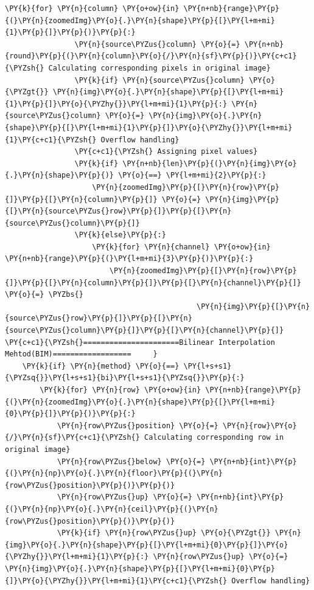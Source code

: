\documentclass[a4paper,10pt]{article}%
\begin{document}
\begin{tcolorbox}[breakable, size=fbox, boxrule=1pt, pad at break*=1mm,colback=cellbackground, colframe=cellborder]
\begin{Verbatim}[commandchars=\\\{\}]
            \PY{k}{for} \PY{n}{column} \PY{o+ow}{in} \PY{n+nb}{range}\PY{p}{(}\PY{n}{zoomedImg}\PY{o}{.}\PY{n}{shape}\PY{p}{[}\PY{l+m+mi}{1}\PY{p}{]}\PY{p}{)}\PY{p}{:}
                \PY{n}{source\PYZus{}column} \PY{o}{=} \PY{n+nb}{round}\PY{p}{(}\PY{n}{column}\PY{o}{/}\PY{n}{sf}\PY{p}{)}\PY{c+c1}{\PYZsh{} Calculating corresponding pixels in original image}
                \PY{k}{if} \PY{n}{source\PYZus{}column} \PY{o}{\PYZgt{}} \PY{n}{img}\PY{o}{.}\PY{n}{shape}\PY{p}{[}\PY{l+m+mi}{1}\PY{p}{]}\PY{o}{\PYZhy{}}\PY{l+m+mi}{1}\PY{p}{:} \PY{n}{source\PYZus{}column} \PY{o}{=} \PY{n}{img}\PY{o}{.}\PY{n}{shape}\PY{p}{[}\PY{l+m+mi}{1}\PY{p}{]}\PY{o}{\PYZhy{}}\PY{l+m+mi}{1}\PY{c+c1}{\PYZsh{} Overflow handling}
                \PY{c+c1}{\PYZsh{} Assigning pixel values}
                \PY{k}{if} \PY{n+nb}{len}\PY{p}{(}\PY{n}{img}\PY{o}{.}\PY{n}{shape}\PY{p}{)} \PY{o}{==} \PY{l+m+mi}{2}\PY{p}{:}
                    \PY{n}{zoomedImg}\PY{p}{[}\PY{n}{row}\PY{p}{]}\PY{p}{[}\PY{n}{column}\PY{p}{]} \PY{o}{=} \PY{n}{img}\PY{p}{[}\PY{n}{source\PYZus{}row}\PY{p}{]}\PY{p}{[}\PY{n}{source\PYZus{}column}\PY{p}{]}
                \PY{k}{else}\PY{p}{:}
                    \PY{k}{for} \PY{n}{channel} \PY{o+ow}{in} \PY{n+nb}{range}\PY{p}{(}\PY{l+m+mi}{3}\PY{p}{)}\PY{p}{:}
                        \PY{n}{zoomedImg}\PY{p}{[}\PY{n}{row}\PY{p}{]}\PY{p}{[}\PY{n}{column}\PY{p}{]}\PY{p}{[}\PY{n}{channel}\PY{p}{]} \PY{o}{=} \PYZbs{}
                                            \PY{n}{img}\PY{p}{[}\PY{n}{source\PYZus{}row}\PY{p}{]}\PY{p}{[}\PY{n}{source\PYZus{}column}\PY{p}{]}\PY{p}{[}\PY{n}{channel}\PY{p}{]}
\PY{c+c1}{\PYZsh{}======================Bilinear Interpolation Mehtod(BIM)==================     }
    \PY{k}{if} \PY{n}{method} \PY{o}{==} \PY{l+s+s1}{\PYZsq{}}\PY{l+s+s1}{bi}\PY{l+s+s1}{\PYZsq{}}\PY{p}{:}
        \PY{k}{for} \PY{n}{row} \PY{o+ow}{in} \PY{n+nb}{range}\PY{p}{(}\PY{n}{zoomedImg}\PY{o}{.}\PY{n}{shape}\PY{p}{[}\PY{l+m+mi}{0}\PY{p}{]}\PY{p}{)}\PY{p}{:}
            \PY{n}{row\PYZus{}position} \PY{o}{=} \PY{n}{row}\PY{o}{/}\PY{n}{sf}\PY{c+c1}{\PYZsh{} Calculating corresponding row in original image}
            \PY{n}{row\PYZus{}below} \PY{o}{=} \PY{n+nb}{int}\PY{p}{(}\PY{n}{np}\PY{o}{.}\PY{n}{floor}\PY{p}{(}\PY{n}{row\PYZus{}position}\PY{p}{)}\PY{p}{)}
            \PY{n}{row\PYZus{}up} \PY{o}{=} \PY{n+nb}{int}\PY{p}{(}\PY{n}{np}\PY{o}{.}\PY{n}{ceil}\PY{p}{(}\PY{n}{row\PYZus{}position}\PY{p}{)}\PY{p}{)}
            \PY{k}{if} \PY{n}{row\PYZus{}up} \PY{o}{\PYZgt{}} \PY{n}{img}\PY{o}{.}\PY{n}{shape}\PY{p}{[}\PY{l+m+mi}{0}\PY{p}{]}\PY{o}{\PYZhy{}}\PY{l+m+mi}{1}\PY{p}{:} \PY{n}{row\PYZus{}up} \PY{o}{=} \PY{n}{img}\PY{o}{.}\PY{n}{shape}\PY{p}{[}\PY{l+m+mi}{0}\PY{p}{]}\PY{o}{\PYZhy{}}\PY{l+m+mi}{1}\PY{c+c1}{\PYZsh{} Overflow handling}

\end{Verbatim}
\end{tcolorbox}
\end{document}
